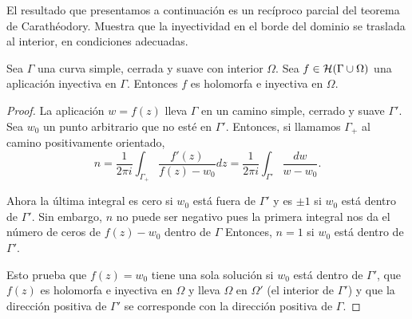 \bigskip

El resultado que presentamos a continuación es un recíproco parcial del teorema de Carathéodory. Muestra que la inyectividad en el borde del dominio se traslada al interior, en condiciones adecuadas.

\begin{theorem}
    Sea $\Gamma$ una curva simple, cerrada y suave con interior $\Omega$. Sea $f \in \mathcal{H}(\Gamma \cup \Omega)$ una aplicación inyectiva en $\Gamma$. Entonces $f$ es holomorfa e inyectiva en $\Omega$.
\end{theorem}

\begin{proof}
    La aplicación $w = f(z)$ lleva $\Gamma$ en un camino simple, cerrado y suave $\Gamma'$. Sea $w_0$ un punto arbitrario que no esté en $\Gamma'$. Entonces, si llamamos $\Gamma_+$ al camino positivamente orientado,
    \begin{equation*}
        n = \dfrac{1}{2 \pi i} \int_{\Gamma_+} \dfrac{f'(z)}{f(z) - w_0} dz =  \dfrac{1}{2 \pi i} \int_{\Gamma'} \dfrac{dw}{w - w_0}.
    \end{equation*}

    Ahora la última integral es cero si $w_0$ está fuera de $\Gamma'$ y es $\pm 1$ si $w_0$ está dentro de $\Gamma'$. Sin embargo, $n$ no puede ser negativo pues la primera integral nos da el número de ceros de $f(z) - w_0$ dentro de $\Gamma$ Entonces, $n=1$ si $w_0$ está dentro de $\Gamma'$.

    Esto prueba que $f(z) = w_0$ tiene una sola solución si $w_0$ está dentro de $\Gamma'$, que $f(z)$ es holomorfa e inyectiva en $\Omega$ y lleva $\Omega$ en $\Omega'$ (el interior de $\Gamma'$) y que la dirección positiva de $\Gamma'$ se corresponde con la dirección positiva de $\Gamma$.
\end{proof}

